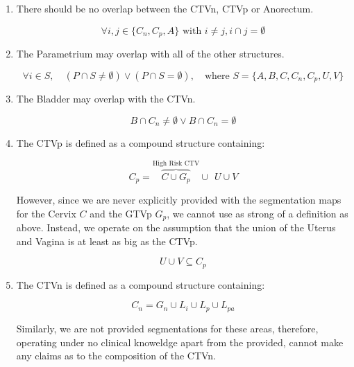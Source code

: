 \documentclass[12pt,twoside]{report}
\begin{document}

\begin{enumerate}
  \item There should be no overlap between the CTVn, CTVp or Anorectum.

        \begin{equation}\label{eq:ctvn-ctvp-anorectum}
          \forall{i,j \in \{C_n, C_p, A\}}\text{ with } i \neq j, i \cap j = \emptyset
        \end{equation}

  \item The Parametrium may overlap with all of the other structures.

        \begin{equation}
          \forall i \in S, \quad (P \cap S \neq \emptyset) \vee (P \cap S = \emptyset), \quad \text{where } S = \{A, B, C, C_n, C_p, U, V\}
        \end{equation}

  \item The Bladder may overlap with the CTVn.

        \begin{equation}
          B \cap C_n \neq \emptyset \vee B \cap C_n = \emptyset\label{eq:ctvn}
        \end{equation}

  \item The CTVp is defined as a compound structure containing:

        \begin{equation}
          C_p = \overbrace{C \cup G_p}^{\text{High Risk CTV}} \cup \ \ U \cup V\label{eq:ctvp1}
        \end{equation}

  However, since we are never explicitly provided with the segmentation maps for the Cervix $C$ and the GTVp $G_p$, we cannot use as strong of a definition as above. Instead, we operate on the assumption that the union of the Uterus and Vagina is at least as big as the CTVp.

        \begin{equation}
          U \cup V \subseteq C_p\label{eq:ctvp2}
        \end{equation}

  \item The CTVn is defined as a compound structure containing:

        \begin{equation}
          C_n = G_n \cup L_i \cup L_p \cup L_{pa}
        \end{equation}

  Similarly, we are not provided segmentations for these areas, therefore, operating under no clinical knoweldge apart from the provided, cannot make any claims as to the composition of the CTVn.

\end{enumerate}
\end{document}

